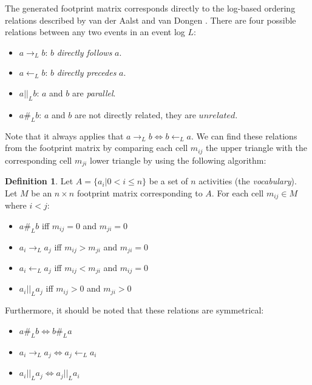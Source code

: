 \documentclass[english,12pt,a4paper,pdftex,sci,utf8]{aaltothesis}
\theoremstyle{definition}
\newtheorem{definition}{Definition}
\begin{document}
The generated footprint matrix corresponds directly to the log-based ordering relations described by van der Aalst and van Dongen \cite{van2013discovering,van2016process}.
There are four possible relations between any two events in an event log $L$:
\begin{itemize}
    \item $a \rightarrow_L b$: $b$ \emph{directly follows} $a$.
    \item $a \leftarrow_L b$: $b$ \emph{directly precedes} $a$.
    \item $a ||_L b$: $a$ and $b$ are \emph{parallel}.
    \item $a \#_L b$: $a$ and $b$ are not directly related, they are $unrelated$.
\end{itemize}

Note that it always applies that $a \rightarrow_L b \Leftrightarrow b \leftarrow_L a$.
We can find these relations from the footprint matrix by comparing each cell $m_{ij}$ the upper triangle with the corresponding cell $m_{ji}$ lower triangle by using the following algorithm:

\begin{definition}
Let $A = \{ a_i | 0 < i \le n \}$ be a set of $n$ activities (the \emph{vocabulary}).
Let $M$ be an $n \times n$ footprint matrix corresponding to $A$.
For each cell $m_{ij} \in M$ where $i < j$:
\begin{itemize}
    \item $a \#_L b$ iff $m_{ij} = 0$ and $m_{ji} = 0$
    \item $a_i \rightarrow_L a_j$ iff $m_{ij} > m_{ji}$ and $m_{ji} = 0$
    \item $a_i \leftarrow_L a_j$ iff $m_{ij} < m_{ji}$ and $m_{ij} = 0$
    \item $a_i ||_L a_j$ iff $m_{ij} > 0$ and $m_{ji} > 0$
\end{itemize}
Furthermore, it should be noted that these relations are symmetrical:
\begin{itemize}
    \item $a \#_L b \Leftrightarrow b \#_L a$ 
    \item $a_i \rightarrow_L a_j \Leftrightarrow a_j \leftarrow_L a_i$
    \item $a_i ||_L a_j \Leftrightarrow a_j ||_L a_i$ 
\end{itemize}
\label{def:logrelations}
\end{definition}
\end{document}
